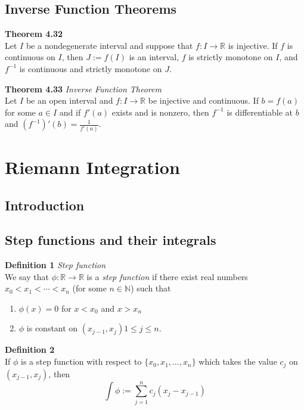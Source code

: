 \documentclass[8pt,landscape]{article}
\begin{document}
\begin{multicols}{3}
    \subsection{Inverse Function Theorems}

    \textbf{Theorem 4.32} \\
    Let $I$ be a nondegenerate interval and suppose that $f : I \to \mathbb{R}$ is
    injective.
    If $f$ is continuous on $I$, then $J := f(I)$ is an interval, $f$ is strictly
    monotone on $I$, and $f^{-1}$ is continuous and strictly monotone on $J$.

    \textbf{Theorem 4.33} \emph{Inverse Function Theorem} \\
    Let $I$ be an open interval and $f : I \to \mathbb{R}$ be injective and continuous.
    If $b = f(a)$ for some $a \in I$ and if $f'(a)$ exists and is nonzero,
    then $f^{-1}$ is differentiable at $b$ and $(f^{-1})'(b) = \frac{1}{f'(a)}$.

    \section{Riemann Integration}

    \subsection{Introduction}

    \subsection{Step functions and their integrals}

    \textbf{Definition 1} \emph{Step function} \\
    We say that $\phi : \mathbb{R} \to \mathbb{R}$ is a \emph{step function} if there
    exist real numbers $x_0 < x_1 < \cdots < x_n$ (for some $n \in \mathbb{N}$) such that
    \begin{enumerate}
        \item $\phi(x) = 0$ for $x < x_0$ and $x > x_n$
        \item $\phi$ is constant on $(x_{j-1}, x_j) 1 \leq j \leq n$.
    \end{enumerate}

    \textbf{Definition 2} \\
    If $\phi$ is a step function with respect to $\{x_0, x_1, \ldots, x_n\}$
    which takes the value $c_j$ on $(x_{j-1}, x_j)$, then
    \[
        \int \phi := \sum_{j=1}^n c_j (x_j - x_{j-1})
    \]


\end{multicols}
\end{document}
